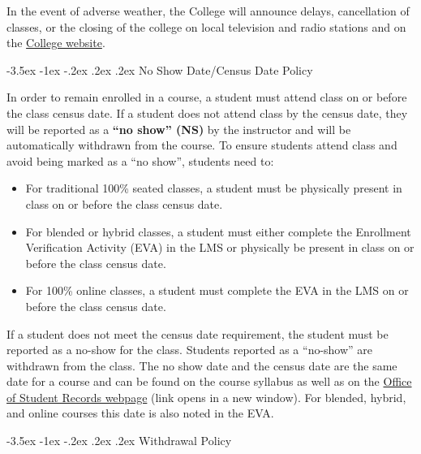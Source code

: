 \documentclass{article}
\makeatletter
\renewcommand\section{\@startsection{section}{1}{0pt}%
  {-3.5ex \@plus -1ex \@minus -.2ex}%
  {.2ex \@plus.2ex}%
  {\normalfont\Large\bfseries}} %
\makeatother
\begin{document}
In the event of adverse weather, the College will announce delays, cancellation of classes, or the closing of the college on local television and radio stations and on the \href{https://www.mitchellcc.edu}{College website}.

\section{No Show Date/Census Date Policy}

In order to remain enrolled in a course, a student must attend class on or before the class census date. If a student does not attend class by the census date, they will be reported as a \textbf{``no show'' (NS)} by the instructor and will be automatically withdrawn from the course.  To ensure students attend class and avoid being marked as a ``no show'', students need to:

\begin{itemize}
\item For traditional 100\% seated classes, a student must be physically present in class on or before the class census date.


\item For blended or hybrid classes, a student must either complete the Enrollment Verification Activity (EVA) in the LMS or physically be present in class on or before the class census date.


\item For 100\% online classes, a student must complete the EVA in the LMS on or before the class census date.
\end{itemize}

If a student does not meet the census date requirement, the student must be reported as a no-show for the class. Students reported as a ``no-show'' are withdrawn from the class.  The no show date and the census date are the same date for a course and can be found on the course syllabus as well as on the \href{https://mitchellcc.edu/office-student-records}{Office of Student Records webpage} (link opens in a new window). For blended, hybrid, and online courses this date is also noted in the EVA.

\section{Withdrawal Policy}
\end{document}
